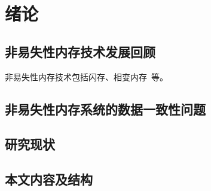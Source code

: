 \chapter{绪论}
\label{chap:intro}

\section{非易失性内存技术发展回顾}

非易失性内存技术包括闪存、相变内存~\cite{Raoux:2008:PRA}等。

\section{非易失性内存系统的数据一致性问题}

\section{研究现状}

\section{本文内容及结构}

